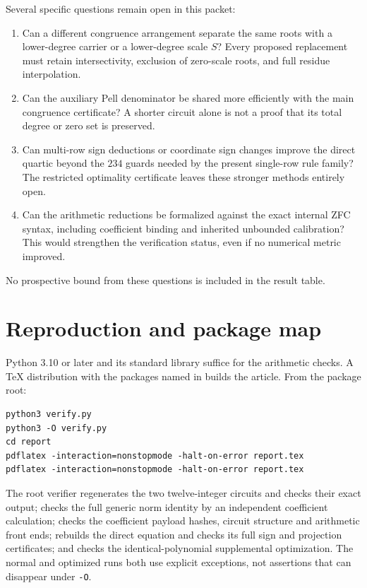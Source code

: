 Several specific questions remain open in this packet:
\begin{enumerate}
 \item Can a different congruence arrangement separate the same roots
 with a lower-degree carrier or a lower-degree scale $S$? Every proposed
 replacement must retain intersectivity, exclusion of zero-scale roots,
 and full residue interpolation.
 \item Can the auxiliary Pell denominator be shared more efficiently
 with the main congruence certificate? A shorter circuit alone is not a
 proof that its total degree or zero set is preserved.
 \item Can multi-row sign deductions or coordinate sign changes improve
 the direct quartic beyond the $234$ guards needed by the present
 single-row rule family? The restricted optimality certificate leaves
 these stronger methods entirely open.
 \item Can the arithmetic reductions be formalized against the exact
 internal ZFC syntax, including coefficient binding and inherited
 unbounded calibration? This would strengthen the verification status,
 even if no numerical metric improved.
\end{enumerate}
No prospective bound from these questions is included in the result
table.

\section{Reproduction and package map}\label{sec:reproduction}
Python 3.10 or later and its standard library suffice for the arithmetic
checks. A TeX distribution with the packages named in
 builds the article. From the package root:
\begin{verbatim}
python3 verify.py
python3 -O verify.py
cd report
pdflatex -interaction=nonstopmode -halt-on-error report.tex
pdflatex -interaction=nonstopmode -halt-on-error report.tex
\end{verbatim}
The root verifier regenerates the two twelve-integer circuits and checks
their exact output; checks the full generic norm identity by an
independent coefficient calculation; checks the coefficient payload
hashes, circuit structure and arithmetic front ends; rebuilds the direct
equation and checks its full sign and projection certificates; and
checks the identical-polynomial supplemental optimization. The normal
and optimized runs both use explicit exceptions, not assertions that
can disappear under \texttt{-O}.

